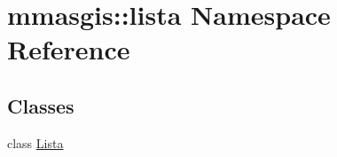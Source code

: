 \hypertarget{namespacemmasgis_1_1lista}{
\section{mmasgis::lista Namespace Reference}
\label{namespacemmasgis_1_1lista}
}
\subsection*{Classes}
\begin{DoxyCompactItemize}
\item 
class \hyperlink{classmmasgis_1_1lista_1_1Lista}{Lista}
\end{DoxyCompactItemize}
